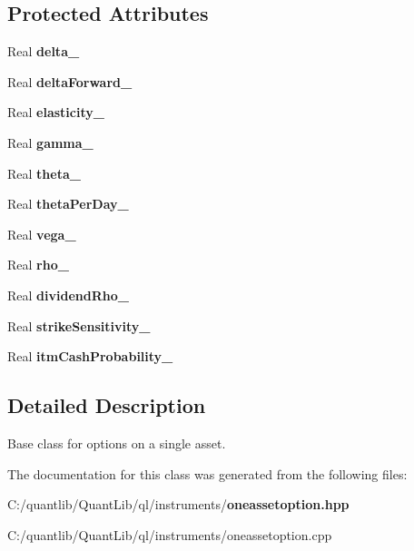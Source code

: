 \subsection*{Protected Attributes}
\begin{DoxyCompactItemize}
\item 
Real {\bfseries delta\+\_\+}\label{class_quant_lib_1_1_one_asset_option_a0f2486ef271b5cfda29f59d6b21726d5}

\item 
Real {\bfseries delta\+Forward\+\_\+}\label{class_quant_lib_1_1_one_asset_option_a46ff6fe39afba281f273310751de4523}

\item 
Real {\bfseries elasticity\+\_\+}\label{class_quant_lib_1_1_one_asset_option_a62eee9c1e86fa3606446f7cb6f5b89fe}

\item 
Real {\bfseries gamma\+\_\+}\label{class_quant_lib_1_1_one_asset_option_acd566d7bddc02fc9b822a27072ccad90}

\item 
Real {\bfseries theta\+\_\+}\label{class_quant_lib_1_1_one_asset_option_a06d44ade435f5aeced2117952abfda11}

\item 
Real {\bfseries theta\+Per\+Day\+\_\+}\label{class_quant_lib_1_1_one_asset_option_a2eaaa309e0848702e8c8328334edacdd}

\item 
Real {\bfseries vega\+\_\+}\label{class_quant_lib_1_1_one_asset_option_aaa99d88f04727d63bca4cb23e164b6e1}

\item 
Real {\bfseries rho\+\_\+}\label{class_quant_lib_1_1_one_asset_option_a7a8b8781122df61dc8d29352d3337621}

\item 
Real {\bfseries dividend\+Rho\+\_\+}\label{class_quant_lib_1_1_one_asset_option_acec199353113b55df04b0b1758988f47}

\item 
Real {\bfseries strike\+Sensitivity\+\_\+}\label{class_quant_lib_1_1_one_asset_option_a60b4335a10c0e0e080eee3685faee269}

\item 
Real {\bfseries itm\+Cash\+Probability\+\_\+}\label{class_quant_lib_1_1_one_asset_option_ac7be4123d83cf536d9dc812a138d87d1}

\end{DoxyCompactItemize}


\subsection{Detailed Description}
Base class for options on a single asset. 

The documentation for this class was generated from the following files\+:\begin{DoxyCompactItemize}
\item 
C\+:/quantlib/\+Quant\+Lib/ql/instruments/{\bf oneassetoption.\+hpp}\item 
C\+:/quantlib/\+Quant\+Lib/ql/instruments/oneassetoption.\+cpp\end{DoxyCompactItemize}
